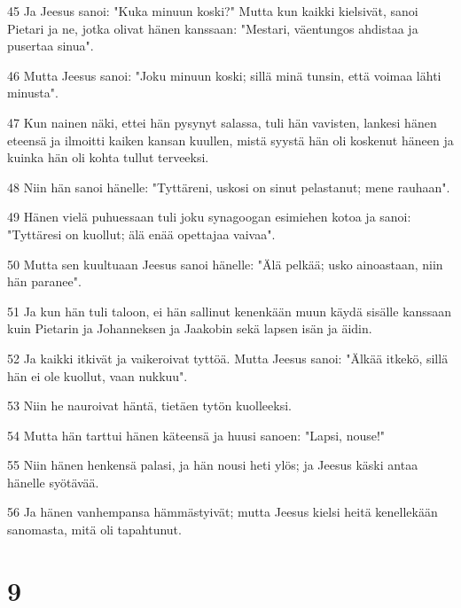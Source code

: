 \par 45 Ja Jeesus sanoi: "Kuka minuun koski?" Mutta kun kaikki kielsivät, sanoi Pietari ja ne, jotka olivat hänen kanssaan: "Mestari, väentungos ahdistaa ja pusertaa sinua".
\par 46 Mutta Jeesus sanoi: "Joku minuun koski; sillä minä tunsin, että voimaa lähti minusta".
\par 47 Kun nainen näki, ettei hän pysynyt salassa, tuli hän vavisten, lankesi hänen eteensä ja ilmoitti kaiken kansan kuullen, mistä syystä hän oli koskenut häneen ja kuinka hän oli kohta tullut terveeksi.
\par 48 Niin hän sanoi hänelle: "Tyttäreni, uskosi on sinut pelastanut; mene rauhaan".
\par 49 Hänen vielä puhuessaan tuli joku synagoogan esimiehen kotoa ja sanoi: "Tyttäresi on kuollut; älä enää opettajaa vaivaa".
\par 50 Mutta sen kuultuaan Jeesus sanoi hänelle: "Älä pelkää; usko ainoastaan, niin hän paranee".
\par 51 Ja kun hän tuli taloon, ei hän sallinut kenenkään muun käydä sisälle kanssaan kuin Pietarin ja Johanneksen ja Jaakobin sekä lapsen isän ja äidin.
\par 52 Ja kaikki itkivät ja vaikeroivat tyttöä. Mutta Jeesus sanoi: "Älkää itkekö, sillä hän ei ole kuollut, vaan nukkuu".
\par 53 Niin he nauroivat häntä, tietäen tytön kuolleeksi.
\par 54 Mutta hän tarttui hänen käteensä ja huusi sanoen: "Lapsi, nouse!"
\par 55 Niin hänen henkensä palasi, ja hän nousi heti ylös; ja Jeesus käski antaa hänelle syötävää.
\par 56 Ja hänen vanhempansa hämmästyivät; mutta Jeesus kielsi heitä kenellekään sanomasta, mitä oli tapahtunut.

\chapter{9}

